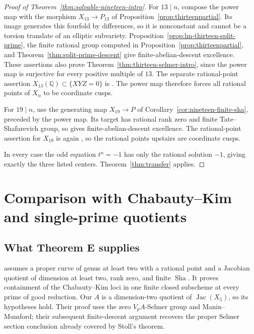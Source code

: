 \documentclass[11pt]{article}
\newcommand{\Q}{\mathbb Q}
\newcommand{\Sha}{\operatorname{Sha}}
\newcommand{\Jac}{\operatorname{Jac}}
\theoremstyle{definition}
\begin{document}
\begin{proof}[Proof of Theorem~\ref{thm:solvable-nineteen-intro}]
For $13\mid n$, compose the power map with the morphism
$X_{13}\to P_{13}$ of Proposition~\ref{prop:thirteenpartial}.
Its image generates this fourfold by differences, so it is nonconstant
and cannot be a torsion translate of an elliptic subvariety.
Proposition~\ref{prop:lm-thirteen-split-prime}, the finite rational
group computed in Proposition~\ref{prop:thirteenpartial}, and
Theorem~\ref{thm:split-prime-descent} give finite-abelian-descent
excellence. These assertions also prove
Theorem~\ref{thm:thirteen-selmer-intro}, since the power map is
surjective for every positive multiple of $13$.
The separate rational-point assertion
$X_{13}(\Q)\subset\{XYZ=0\}$ is
\citet[Theorem~0.5, p.~448]{Wiles1995}. The power map therefore forces
all rational points of $X_n$ to be coordinate cusps.

For $19\mid n$, use the generating map $X_{19}\to P$ of
Corollary~\ref{cor:nineteen-finite-sha}, preceded by the power map.
Its target has rational rank zero and finite Tate--Shafarevich group,
so \citet[Theorem~8.6, p.~385]{Stoll2007} gives
finite-abelian-descent excellence. The rational-point assertion
for $X_{19}$ is again \citet[Theorem~0.5, p.~448]{Wiles1995}, so the
rational points upstairs are coordinate cusps.

In every case the odd equation $t^n=-1$ has only the rational
solution $-1$, giving exactly the three listed centers.
Theorem~\ref{thm:transfer} applies.
\end{proof}






















\section{Comparison with Chabauty--Kim and single-prime quotients}

\subsection{What Theorem E supplies}
\citet[Theorem E and \S5.7]{BKL2026} assumes a proper curve of genus at
least two with a rational point and a Jacobian quotient of dimension
at least two, rank zero, and finite $\Sha$. It proves containment of
the Chabauty--Kim loci in one finite closed subscheme at every prime
of good reduction. Our $A$ is a dimension-two quotient of
$\Jac(X_5)$, so its hypotheses hold. Their proof uses the zero
$V_pA$-Selmer group and Manin--Mumford; their subsequent finite-descent
argument recovers the proper Selmer section conclusion already
covered by Stoll's theorem.
\end{document}
